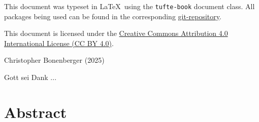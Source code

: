 \maketitle%
\setlength{\parindent}{0pt}%
\thispagestyle{empty}

This document was typeset in \LaTeX~using the \texttt{tufte-book} document class. All packages being used can be found in the corresponding  \href{https://github.com/cmab92/TeXamples/tree/master/books/main.tex}{git-repository}. \\\newline 

This document is licensed under the 
\href{https://creativecommons.org/licenses/by/4.0/}{Creative Commons Attribution 4.0 International License (CC BY 4.0)}. \\\newline 

\vfill
Christopher Bonenberger (2025) \titleofthesis \clearpage
\setlength{\parindent}{0pt}%
\thispagestyle{empty}
\vfill


\thispagestyle{empty}
\setlength{\parindent}{0pt}%
\hfill %
\begin{fullwidth}
		{\centering
			\kitschy\LARGE Gott sei Dank ...\par
		}
\end{fullwidth}
\setlength{\parindent}{0pt}%
\cleardoublepage



\section*{Abstract}
\thispagestyle{empty}
\setlength{\parindent}{0pt}%

\cleardoublepage